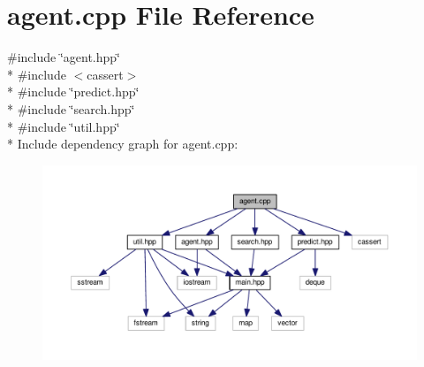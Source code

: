 \section{agent.\+cpp File Reference}
\label{agent_8cpp}
{\ttfamily \#include \char`\"{}agent.\+hpp\char`\"{}}\\*
{\ttfamily \#include $<$cassert$>$}\\*
{\ttfamily \#include \char`\"{}predict.\+hpp\char`\"{}}\\*
{\ttfamily \#include \char`\"{}search.\+hpp\char`\"{}}\\*
{\ttfamily \#include \char`\"{}util.\+hpp\char`\"{}}\\*
Include dependency graph for agent.\+cpp\+:
\nopagebreak
\begin{figure}[H]
\begin{center}
\leavevmode
\includegraphics[width=350pt]{agent_8cpp__incl}
\end{center}
\end{figure}
